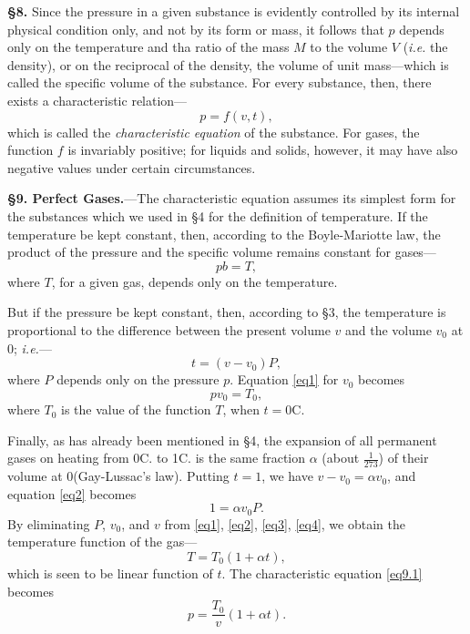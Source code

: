 \documentclass[oneside,12pt]{book}
\begin{document}
\textbf{\S 8.} Since the pressure in a given substance is evidently controlled by its internal physical condition only, and not by its form or mass, it follows that $p$ depends only on the temperature and tha ratio of the mass $M$ to the volume $V$ (\textit{i.e.} the density), or on the reciprocal of the density, the volume of unit mass---which is called the specific volume of the substance. For every substance, then, there exists a characteristic relation---
$$p=f(v,t),$$
which is called the \textit{characteristic equation} of the substance. For gases, the function $f$ is invariably positive; for liquids and solids, however, it may have also negative values under certain circumstances. \par

\setcounter{equation}{0}
\textbf{\S 9. Perfect Gases.}---The characteristic equation assumes its simplest form for the substances which we used in \S 4 for the definition of temperature. If the temperature be kept constant, then, according to the Boyle-Mariotte law, the product of the pressure and the specific volume remains constant for gases---
\begin{equation}
    pb=T,
    \label{eq1}
\end{equation}
where $T$, for a given gas, depends only on the temperature. \par

But if the pressure be kept constant, then, according to \S 3, the temperature is proportional to the difference between the present volume $v$ and the volume $v_0$ at 0\textdegree; \textit{i.e.}---
\begin{equation}
    t=(v-v_0)P,
    \label{eq2}
\end{equation}
where $P$ depends only on the pressure $p$. Equation \eqref{eq1} for $v_0$ becomes
\begin{equation}
    pv_0=T_0,
    \label{eq3}
\end{equation}
where $T_0$ is the value of the function $T$, when $t=0$\textdegree C. \par

Finally, as has already been mentioned in \S 4, the expansion of all permanent gases on heating from 0\textdegree C. to 1\textdegree C. is the same fraction $\alpha$ (about $\frac{1}{273}$) of their volume at 0\textdegree (Gay-Lussac's law). Putting $t=1$, we have $v-v_0=\alpha v_0$, and equation \eqref{eq2} becomes
\begin{equation}
    1=\alpha v_0P.
    \label{eq4}
\end{equation}
By eliminating $P$, $v_0$, and $v$ from \eqref{eq1}, \eqref{eq2}, \eqref{eq3}, \eqref{eq4}, we obtain the temperature function of the gas---
$$T=T_0(1+\alpha t),$$
which is seen to be linear function of $t$. The characteristic equation \eqref{eq9.1} becomes
$$p=\frac{T_0}{v}(1+\alpha t).$$ \par
\end{document}
